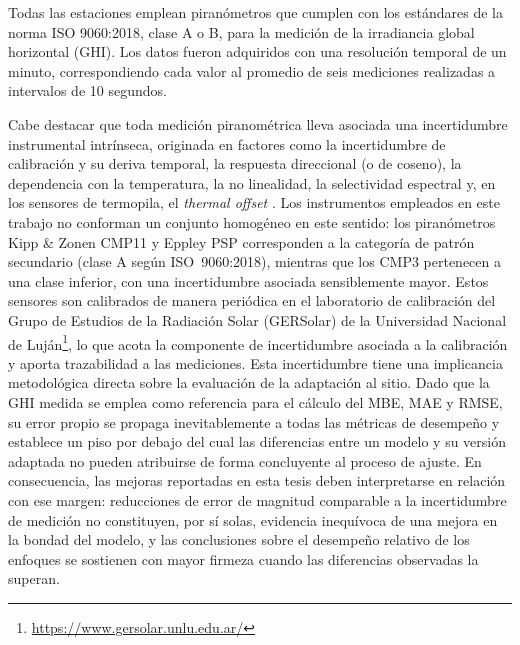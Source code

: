 Todas las estaciones emplean piranómetros que cumplen con los estándares de la norma ISO 9060:2018, clase A o B, para la medición de la irradiancia global horizontal (GHI). Los datos fueron adquiridos con una resolución temporal de un minuto, correspondiendo cada valor al promedio de seis mediciones realizadas a intervalos de 10 segundos.

Cabe destacar que toda medición piranométrica lleva asociada una incertidumbre instrumental intrínseca, originada en factores como la
incertidumbre de calibración y su deriva temporal, la respuesta direccional (o de coseno), la dependencia con la temperatura, la no linealidad, la selectividad espectral y, en los sensores de termopila, el \emph{thermal offset} \citep{Gueymard2009, Sengupta2024}. Los instrumentos empleados en este trabajo no conforman un conjunto homogéneo en este sentido: los piranómetros Kipp \& Zonen CMP11 y Eppley PSP corresponden a la categoría de patrón secundario (clase A según ISO~9060:2018), mientras que los CMP3 pertenecen a una clase inferior, con una incertidumbre asociada sensiblemente mayor. Estos sensores son calibrados de manera periódica en el laboratorio de calibración del Grupo de Estudios de la
Radiación Solar (GERSolar) de la Universidad Nacional de Luján\footnote{\url{https://www.gersolar.unlu.edu.ar/}}, lo que acota la componente de incertidumbre asociada a la calibración y aporta trazabilidad a las mediciones. Esta incertidumbre tiene una implicancia metodológica directa sobre la evaluación de la adaptación al sitio. Dado que la GHI medida se emplea como referencia para el cálculo del MBE, MAE y RMSE, su error propio se propaga inevitablemente a todas las métricas de desempeño y establece un piso por debajo del cual las diferencias entre un modelo y su versión adaptada no pueden atribuirse de forma concluyente al proceso de ajuste. En consecuencia, las mejoras reportadas en esta tesis deben interpretarse en relación con ese margen: reducciones de error de magnitud comparable a la incertidumbre de medición no constituyen, por sí solas, evidencia inequívoca de una mejora en la bondad del modelo, y las conclusiones sobre el desempeño relativo de los enfoques se sostienen con mayor firmeza cuando las diferencias observadas la superan.


